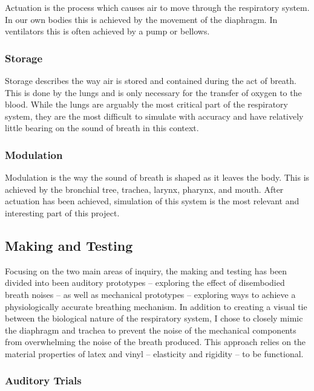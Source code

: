 \documentclass[letterpaper]{article}
\begin{document}
Actuation is the process which causes air to move through the respiratory system. In our own bodies this is achieved by the movement of the diaphragm. In ventilators this is often achieved by a pump or bellows.

\subsubsection{Storage}

Storage describes the way air is stored and contained during the act of breath. This is done by the lungs and is only necessary for the transfer of oxygen to the blood. While the lungs are arguably the most critical part of the respiratory system, they are the most difficult to simulate with accuracy and have relatively little bearing on the sound of breath in this context.

\subsubsection{Modulation}

Modulation is the way the sound of breath is shaped as it leaves the body. This is achieved by the bronchial tree, trachea, larynx, pharynx, and mouth.\cite{sarkar} After actuation has been achieved, simulation of this system is the most relevant and interesting part of this project.   

\subsection{Making and Testing}

Focusing on the two main areas of inquiry, the making and testing has been divided into been auditory prototypes -- exploring the effect of disembodied breath noises -- as well as mechanical prototypes -- exploring ways to achieve a physiologically accurate breathing mechanism. In addition to creating a visual tie between the biological nature of the respiratory system, I chose to closely mimic the diaphragm and trachea to prevent the noise of the mechanical components from overwhelming the noise of the breath produced. This approach relies on the material properties of latex and vinyl -- elasticity and rigidity -- to be functional.

\subsubsection{Auditory Trials}
\end{document}
